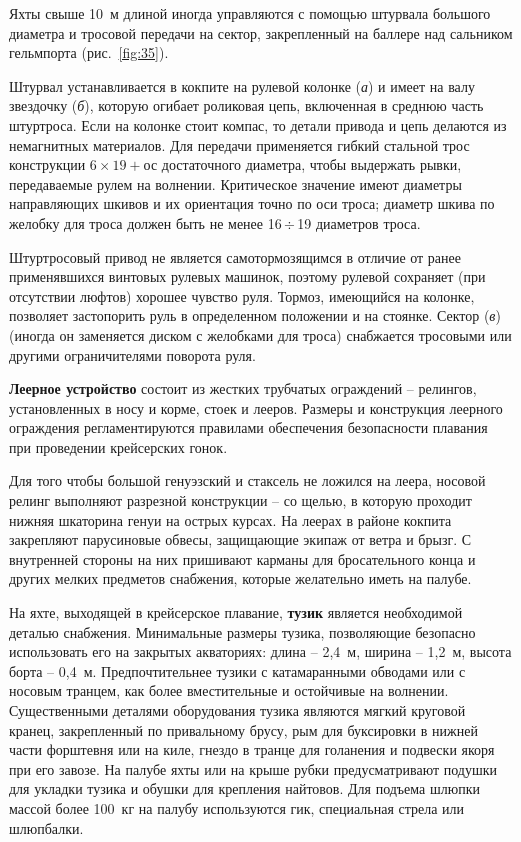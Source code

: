 \documentclass[a4paper, 12pt, twoside, final, book, russian, fittopage, cyremdash]{ncc}
\newcommand{\otdo}{\,\ensuremath{\div}\,}
\newcommand{\ris}[1]{\ref{fig:#1}}
\begin{document}
Яхты свыше 10~м длиной иногда управляются с помощью штурвала большого диаметра и тросовой передачи на сектор, закрепленный на баллере над сальником гельмпорта (рис.~\ris{35}).

Штурвал устанавливается в кокпите на рулевой колонке (\textit{а}) и имеет на валу звездочку (\textit{б}), которую огибает роликовая цепь, включенная в среднюю часть штуртроса. Если на колонке стоит компас, то детали привода и цепь делаются из немагнитных материалов. Для передачи применяется гибкий стальной трос конструкции $6 \times 19 +$ос достаточного диаметра, чтобы выдержать рывки, передаваемые рулем на волнении. Критическое значение имеют диаметры направляющих шкивов и их ориентация точно по оси троса; диаметр шкива по желобку для троса должен быть не менее 16\otdo 19 диаметров троса.

Штуртросовый привод не является самотормозящимся в отличие от ранее применявшихся винтовых рулевых машинок, поэтому рулевой сохраняет (при отсутствии люфтов) хорошее чувство руля. Тормоз, имеющийся на колонке, позволяет застопорить руль в определенном положении и на стоянке. Сектор (\textit{в}) (иногда он заменяется диском с желобками для троса) снабжается тросовыми или другими ограничителями поворота руля. 
 
\textbf{Леерное устройство} состоит из жестких трубчатых ограждений \--- релингов, установленных в носу и корме, стоек и лееров. Размеры и конструкция леерного ограждения регламентируются правилами обеспечения безопасности плавания при проведении крейсерских гонок.

Для того чтобы большой генуэзский и стаксель не ложился на леера, носовой релинг выполняют разрезной конструкции \--- со щелью, в которую проходит нижняя шкаторина генуи на острых курсах. На леерах в районе кокпита закрепляют парусиновые обвесы, защищающие экипаж от ветра и брызг. С внутренней стороны на них пришивают карманы для бросательного конца и других мелких предметов снабжения, которые желательно иметь на палубе.

На яхте, выходящей в крейсерское плавание, \textbf{тузик} является необходимой деталью снабжения. Минимальные размеры тузика, позволяющие безопасно использовать его на закрытых акваториях: длина \--- 2,4~м, ширина \--- 1,2~м, высота борта \--- 0,4~м. Предпочтительнее тузики с катамаранными обводами или с носовым транцем, как более вместительные и остойчивые на волнении. Существенными деталями оборудования тузика являются мягкий круговой кранец, закрепленный по привальному брусу, рым для буксировки в нижней части форштевня или на киле, гнездо в транце для голанения и подвески якоря при его завозе. На палубе яхты или на крыше рубки предусматривают подушки для укладки тузика и обушки для крепления найтовов. Для подъема шлюпки массой более 100~кг на палубу используются гик, специальная стрела или шлюпбалки. 
\end{document}
